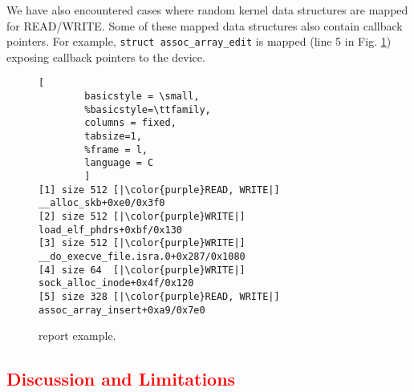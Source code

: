 We have also encountered cases where random kernel data structures are mapped for READ/WRITE. Some of these mapped data structures also contain callback pointers. For example, \texttt{struct assoc\_array\_edit} is mapped (line 5 in Fig. \ref{fig:dkasan-report}) exposing callback pointers to the device. 
%
\begin{figure}[t]
\begin{adjustbox}{width=0.9\linewidth}
        \begin{lstlisting}[
        basicstyle = \small,
        %basicstyle=\ttfamily,
        columns = fixed,
        tabsize=1,
        %frame = l,
        language = C
        ]
[1] size 512 [|\color{purple}READ, WRITE|] __alloc_skb+0xe0/0x3f0
[2] size 512 [|\color{purple}WRITE|] load_elf_phdrs+0xbf/0x130
[3] size 512 [|\color{purple}WRITE|] __do_execve_file.isra.0+0x287/0x1080
[4] size 64  [|\color{purple}WRITE|] sock_alloc_inode+0x4f/0x120
[5] size 328 [|\color{purple}READ, WRITE|] assoc_array_insert+0xa9/0x7e0
        \end{lstlisting}
\end{adjustbox}
        \caption{\dkasan report example.}
        \label{fig:dkasan-report}
\end{figure}

\subsection{\textcolor{red}{Discussion and Limitations}}
